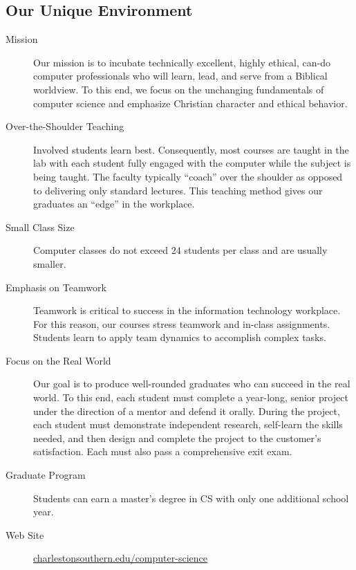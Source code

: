 \subsection{Our Unique Environment}
\begin{description}
	\item[Mission] Our mission is to incubate technically excellent, highly ethical, can-do computer professionals who will learn, lead, and serve from a Biblical worldview. To this end, we focus on the unchanging fundamentals of computer science and emphasize Christian character and ethical behavior.
	\item[Over-the-Shoulder Teaching] Involved students learn best. Consequently, most courses are taught in the lab with each student fully engaged with the computer while the subject is being taught. The faculty typically ``coach'' over the shoulder as opposed to delivering only standard lectures. This teaching method gives our graduates an “edge” in the workplace.
	\item[Small Class Size] Computer classes do not exceed 24 students per class and are usually smaller.
	\item[Emphasis on Teamwork] Teamwork is critical to success in the information technology workplace. For this reason, our courses stress teamwork and in-class assignments. Students learn to apply team dynamics to accomplish complex tasks.
	\item[Focus on the Real World] Our goal is to produce well-rounded graduates who can succeed in the real world.  To this end, each student must complete a year-long, senior project under the direction of a mentor and defend it orally. During the project, each student must demonstrate independent research, self-learn the skills needed, and then design and complete the project to the customer's satisfaction.  Each must also pass a comprehensive exit exam.
	\item[Graduate Program] Students can earn a master's degree in CS with only one additional school year.
	\item[Web Site] \href{https://charlestonsouthern.edu/computer-science}{charlestonsouthern.edu/computer-science}
\end{description}